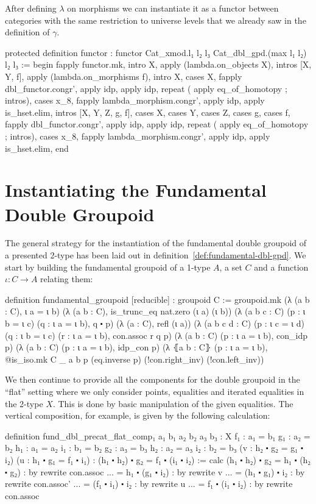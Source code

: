 After defining $\lambda$ on morphisms we can instantiate it as a functor between
categories with the same restriction to universe levels that we already saw in
the definition of $\gamma$.
\begin{leancodebr}
  protected definition functor :
    functor Cat_xmod.{l₁ l₂ l₃} Cat_dbl_gpd.{(max l₁ l₂) l₂ l₃} :=
  begin
    fapply functor.mk,
      intro X, apply (lambda.on_objects X),
      intros [X, Y, f], apply (lambda.on_morphisms f),
      intro X, cases X,
        fapply dbl_functor.congr', apply idp, apply idp,
        repeat ( apply eq_of_homotopy ; intros), cases x_8,
        fapply lambda_morphism.congr', apply idp,
        apply is_hset.elim,
      intros [X, Y, Z, g, f], cases X, cases Y, cases Z, cases g, cases f,
        fapply dbl_functor.congr', apply idp, apply idp,
        repeat ( apply eq_of_homotopy ; intros), cases x_8,
        fapply lambda_morphism.congr', apply idp,
        apply is_hset.elim,
  end
\end{leancodebr}

\section{Instantiating the Fundamental Double Group\-oid}

The general strategy for the instantiation of the fundamental double group\-oid
of a presented 2-type has been laid out in definition~\ref{def:fundamental-dbl-gpd}.
We start by building the fundamental groupoid of a 1-type $A$, a set $C$ and a
function $\iota : C \to A$ relating them:
\begin{leancodebr}
  definition fundamental_groupoid [reducible] : groupoid C :=
  groupoid.mk
    (λ (a b : C), ι a =  ι b)
    (λ (a b : C), is_trunc_eq nat.zero (ι a) (ι b))
    (λ (a b c : C) (p : ι b = ι c) (q : ι a = ι b), q ⬝ p)
    (λ (a : C), refl (ι a))
    (λ (a b c d : C) (p : ι c = ι d) (q : ι b = ι c) (r : ι a = ι b),
      con.assoc r q p)
    (λ (a b : C) (p : ι a = ι b), con_idp p)
    (λ (a b : C) (p : ι a = ι b), idp_con p)
    (λ ⦃a b : C⦄ (p : ι a = ι b),
      @is_iso.mk C _ a b p (eq.inverse p) (!con.right_inv) (!con.left_inv))
\end{leancodebr}

We then continue to provide all the components for the double groupoid in the ``flat''
setting where we only consider points, equalities and iterated equalities in the
2-type $X$.
This is done by basic manipulation of the given equalities.
The vertical composition, for example, is given by the following calculation:
\begin{leancodebr}
  definition fund_dbl_precat_flat_comp₁ {a₁ b₁ a₂ b₂ a₃ b₃ : X}
    {f₁ : a₁ = b₁} {g₁ : a₂ = b₂} {h₁ : a₁ = a₂} {i₁ : b₁ = b₂}
    {g₂ : a₃ = b₃} {h₂ : a₂ = a₃} {i₂ : b₂ = b₃}
    (v : h₂ ⬝ g₂ = g₁ ⬝ i₂) (u : h₁ ⬝ g₁ = f₁ ⬝ i₁) :
    (h₁ ⬝ h₂) ⬝ g₂ = f₁ ⬝ (i₁ ⬝ i₂) :=
  calc (h₁ ⬝ h₂) ⬝ g₂ = h₁ ⬝ (h₂ ⬝ g₂) : by rewrite con.assoc
                 ... = h₁ ⬝ (g₁ ⬝ i₂) : by rewrite v
                 ... = (h₁ ⬝ g₁) ⬝ i₂ : by rewrite con.assoc'
                 ... = (f₁ ⬝ i₁) ⬝ i₂ : by rewrite u
                 ... = f₁ ⬝ (i₁ ⬝ i₂) : by rewrite con.assoc
\end{leancodebr}


